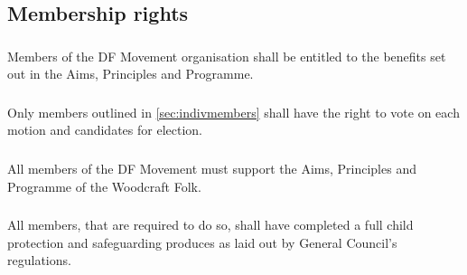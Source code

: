 \documentclass[a4paper, 12pt]{report}
\begin{document}

\subsection{Membership rights}
\subsubsection{}
Members of the DF Movement organisation shall be entitled to the benefits set out in the Aims, Principles and Programme.
\subsubsection{}
Only members outlined in \ref{sec:indivmembers} shall have the right to vote on each motion and
candidates for election.
\subsubsection{}
All members of the DF Movement must support the Aims, Principles and Programme of the Woodcraft Folk.
\subsubsection{}
All members, that are required to do so, shall have completed a full child protection and safeguarding produces as laid out by General Council's regulations.
\end{document}
